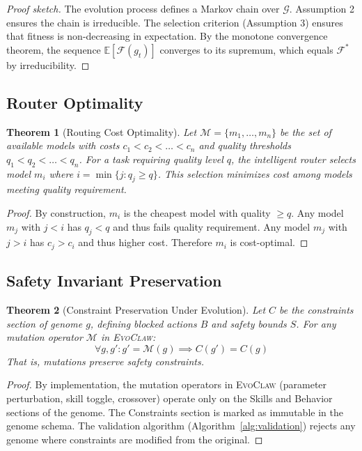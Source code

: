 \documentclass{article}
\newtheorem{theorem}{Theorem}
\newcommand{\evoclaw}{\textsc{EvoClaw}}
\newcommand{\fitnessfn}{\mathcal{F}}
\newcommand{\genomespace}{\mathcal{G}}
\newcommand{\mutation}{\mathcal{M}}
\begin{document}
\begin{proof}[Proof sketch]
The evolution process defines a Markov chain over $\genomespace$. Assumption 2 ensures the chain is irreducible. The selection criterion (Assumption 3) ensures that fitness is non-decreasing in expectation. By the monotone convergence theorem, the sequence $\mathbb{E}[\fitnessfn(g_t)]$ converges to its supremum, which equals $\fitnessfn^*$ by irreducibility.
\end{proof}

\subsection{Router Optimality}

\begin{theorem}[Routing Cost Optimality]
Let $\mathcal{M} = \{m_1, \ldots, m_n\}$ be the set of available models with costs $c_1 < c_2 < \ldots < c_n$ and quality thresholds $q_1 < q_2 < \ldots < q_n$. For a task requiring quality level $q$, the intelligent router selects model $m_i$ where $i = \min\{j : q_j \geq q\}$. This selection minimizes cost among models meeting quality requirement.
\end{theorem}

\begin{proof}
By construction, $m_i$ is the cheapest model with quality $\geq q$. Any model $m_j$ with $j < i$ has $q_j < q$ and thus fails quality requirement. Any model $m_j$ with $j > i$ has $c_j > c_i$ and thus higher cost. Therefore $m_i$ is cost-optimal.
\end{proof}

\subsection{Safety Invariant Preservation}

\begin{theorem}[Constraint Preservation Under Evolution]
Let $C$ be the constraints section of genome $g$, defining blocked actions $B$ and safety bounds $S$. For any mutation operator $\mutation$ in \evoclaw{}:
\begin{equation}
\forall g, g' : g' = \mutation(g) \implies C(g') = C(g)
\end{equation}
That is, mutations preserve safety constraints.
\end{theorem}

\begin{proof}
By implementation, the mutation operators in \evoclaw{} (parameter perturbation, skill toggle, crossover) operate only on the Skills and Behavior sections of the genome. The Constraints section is marked as immutable in the genome schema. The validation algorithm (Algorithm~\ref{alg:validation}) rejects any genome where constraints are modified from the original.
\end{proof}
\end{document}
